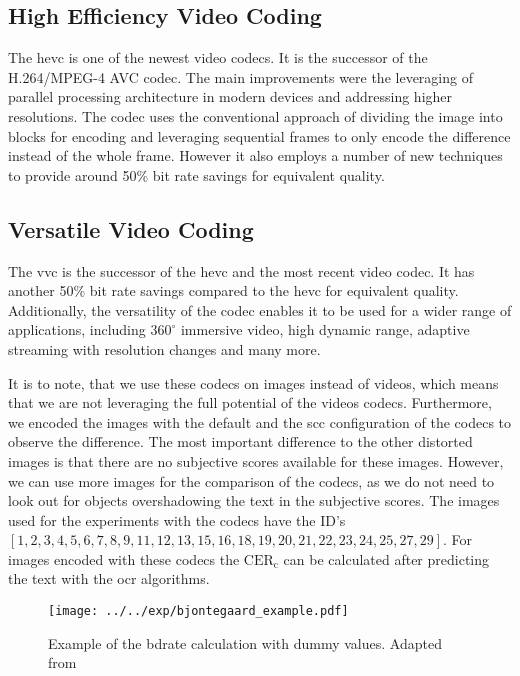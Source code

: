 \subsection{High Efficiency Video Coding}
\label{subsec:hevc}

The \gls{hevc} \cite{hevc_2012} is one of the newest video codecs.
It is the successor of the H.264/MPEG-4 AVC codec.
The main improvements were the leveraging of parallel processing architecture in modern devices and addressing higher resolutions.
The codec uses the conventional approach of dividing the image into blocks for encoding and leveraging sequential frames to only encode the difference instead of the whole frame.
However it also employs a number of new techniques to provide around 50\% bit rate savings for equivalent quality.

\subsection{Versatile Video Coding}
\label{subsec:vvc}

The \gls{vvc} \cite{vvc_2021} is the successor of the \gls{hevc} and the most recent video codec.
It has another 50\% bit rate savings compared to the \gls{hevc} for equivalent quality.
Additionally, the versatility of the codec enables it to be used for a wider range of applications, including $360^{\circ}$ immersive video, high dynamic range, adaptive streaming with resolution changes and many more.


It is to note, that we use these codecs on images instead of videos, which means that we are not leveraging the full potential of the videos codecs.
Furthermore, we encoded the images with the default and the \gls{scc} configuration of the codecs to observe the difference.
The most important difference to the other distorted images is that there are no subjective scores available for these images.
However, we can use more images for the comparison of the codecs, as we do not need to look out for objects overshadowing the text in the subjective scores.
The images used for the experiments with the codecs have the ID's $[1, 2, 3, 4, 5, 6, 7, 8, 9, 11, 12, 13, 15, 16, 18, 19, 20, 21, 22, 23, 24, 25, 27, 29]$.
For images encoded with these codecs the $\text{CER}_{\text{c}}$ can be calculated after predicting the text with the \gls{ocr} algorithms.

\begin{figure}
    \centering
    \texttt{[image: ../../exp/bjontegaard\_example.pdf]}
    \caption{Example of the \gls{bdrate} calculation with dummy values. Adapted from \cite{bdrate_beyond_2022}}
    \label{fig:bdrate_example}
\end{figure}

